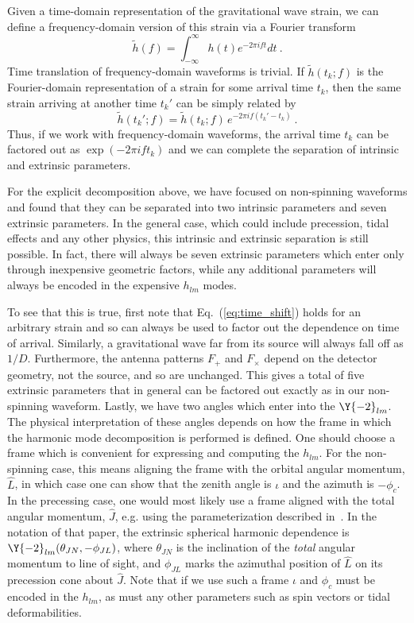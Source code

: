 Given a time-domain representation of the gravitational wave strain, we can define a 
frequency-domain version of this strain via a Fourier transform
\begin{equation} \label{eq:Fourier}
\tilde{h}(f) = \int_{-\infty}^\infty h(t) e^{- 2 \pi i f t} dt\ .
\end{equation}
Time translation of frequency-domain waveforms is trivial.
If $\tilde{h}(t_k;f)$ is the Fourier-domain representation of a strain for some arrival time $t_k$, then
the same strain arriving at another time $t_k'$ can be simply related by
\begin{equation} \label{eq:time_shift}
\tilde{h}(t_k';f) = \tilde{h}(t_k;f) \, e^{- 2 \pi i f (t_k' - t_k)}\ .
\end{equation}
Thus, if we work with frequency-domain waveforms, the arrival time $t_k$ 
can be factored out as $\exp( - 2 \pi i f t_k)$
and we can complete the separation of intrinsic and extrinsic parameters.

For the explicit decomposition above, we have focused on non-spinning waveforms 
and found that they can be separated into two intrinsic parameters and seven
extrinsic parameters. In the general case, which could include precession,
tidal effects and any other physics, this intrinsic and extrinsic separation is still
possible. In fact, there will always be seven extrinsic parameters which enter only
through inexpensive geometric factors, while any additional parameters will always
be encoded in the expensive $h_{lm}$ modes.

To see that this is true, first note that Eq.~(\ref{eq:time_shift}) holds for an arbitrary strain
and so can always be used to factor out the dependence on time of arrival. Similarly,
a gravitational wave far from its source will always fall off as $1/D$. Furthermore, 
the antenna patterns $F_+$ and $F_\times$ depend on the detector geometry,
not the source, and so are unchanged. This gives a total of five extrinsic parameters
that in general can be factored out exactly as in our non-spinning waveform. Lastly, 
we have two angles which enter into the $\Y{-2}_{lm}$. The physical interpretation 
of these angles depends on how the frame in which the harmonic mode decomposition is 
performed is defined. One should choose a frame which is convenient for expressing 
and computing the $h_{lm}$. For the non-spinning case, this means aligning the frame 
with the orbital angular momentum, $\hat{L}$, in which case one can show that the 
zenith angle is $\iota$ and the azimuth is $- \phi_c$. In the precessing case, one would
most likely use a frame aligned with the total angular momentum, $\hat{J}$, e.g. using the
parameterization described in~\cite{Farr:2014qka}. In the notation of that paper, the extrinsic
spherical harmonic dependence is $\Y{-2}_{lm}(\theta_{JN},-\phi_{JL})$, 
where $\theta_{JN}$ is the inclination of the \emph{total} angular momentum to line of sight,
and $\phi_{JL}$ marks the azimuthal position of $\hat{L}$ on its precession cone about $\hat{J}$.
Note that if we use such a frame $\iota$ and $\phi_c$ must be encoded in the $h_{lm}$, 
as must any other parameters such as spin vectors or tidal deformabilities.


